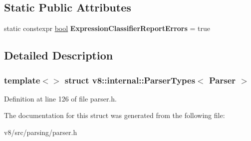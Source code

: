 \subsection*{Static Public Attributes}
\begin{DoxyCompactItemize}
\item 
\mbox{\label{structv8_1_1internal_1_1ParserTypes_3_01Parser_01_4_aae7be5775995d0d9ae4e1ef67f9d40da}} 
static constexpr \mbox{\hyperlink{classbool}{bool}} {\bfseries Expression\+Classifier\+Report\+Errors} = true
\end{DoxyCompactItemize}


\subsection{Detailed Description}
\subsubsection*{template$<$$>$\newline
struct v8\+::internal\+::\+Parser\+Types$<$ Parser $>$}



Definition at line 126 of file parser.\+h.



The documentation for this struct was generated from the following file\+:\begin{DoxyCompactItemize}
\item 
v8/src/parsing/parser.\+h\end{DoxyCompactItemize}
